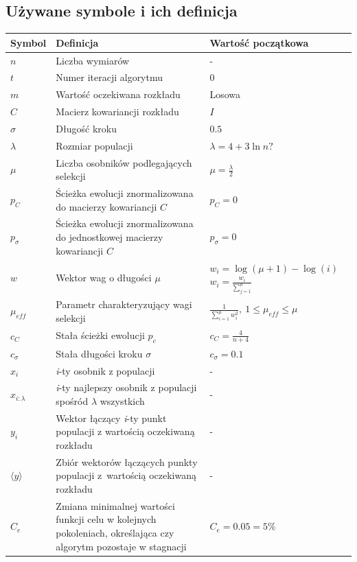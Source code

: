 \documentclass[10pt]{article}
\begin{document}
\subsection{Używane symbole i ich definicja}
\label{sec:symbols}
\begin{center}
\begin{tabular}{ |p{2cm}|p{7cm}|p{4cm}| } 
\hline
\textbf{Symbol} & \textbf{Definicja} & \textbf{Wartość początkowa} \\
\hline  \hline
$n$ & Liczba wymiarów & - \\ 
\hline
$t$ & Numer iteracji algorytmu & 0 \\ 
\hline
$m$ & Wartość oczekiwana rozkładu & Losowa \\ 
\hline
$C$ & Macierz kowariancji rozkładu &  $I$ \\
\hline
$\sigma$ & Długość kroku & $0.5$ \\
\hline
$\lambda$ & Rozmiar populacji & $\lambda = 4 + 3 \ln n ?$\\
\hline
$\mu$ & Liczba osobników podlegających selekcji & $\mu = \frac{\lambda}{2}$ \\
\hline
$p_C$ & Ścieżka ewolucji znormalizowana do macierzy kowariancji $C$ & $p_C = 0$ \\
\hline
$p_{\sigma}$ & Ścieżka ewolucji znormalizowana do jednostkowej macierzy kowariancji $C$ & $p_{\sigma} = 0$ \\
\hline
$w$ & Wektor wag o długości $\mu$ & $w_i = \log (\mu + 1) - \log (i)$ $w_i = \frac{w_i}{\sum ^{\mu}_{j=1}}$ \\
\hline 
$\mu_{eff}$ & Parametr charakteryzujący wagi selekcji &$\frac{1}{\sum ^{\mu}_{i=1}w_i^2}, \: 1 \leq \mu_{eff} \leq \mu $ \\
\hline 
$c_C$ &Stała ścieżki ewolucji $p_c$& $c_C = \frac{4}{n+4}$ \\
\hline 
$c_{\sigma}$ & Stała długości kroku $\sigma$ & $c_{\sigma} = 0.1$ \\
\hline 
$x_i$ & \textit{i}-ty osobnik z populacji & - \\
\hline
$x_{i:\lambda} $ &\textit{i}-ty najlepszy osobnik z populacji spośród $\lambda$ wszystkich & - \\
\hline
$y_i$ & Wektor łączący \textit{i}-ty punkt populacji z wartością oczekiwaną rozkładu & - \\
\hline
$\langle y \rangle $ & Zbiór wektorów łączących punkty populacji z~wartością
oczekiwaną rozkładu & - \\
\hline
$C_e$ & Zmiana minimalnej wartości funkcji celu w kolejnych pokoleniach, określająca czy algorytm pozostaje w stagnacji & $C_e = 0.05 = 5\%$ \\

\end{tabular}
\end{center}
\end{document}
